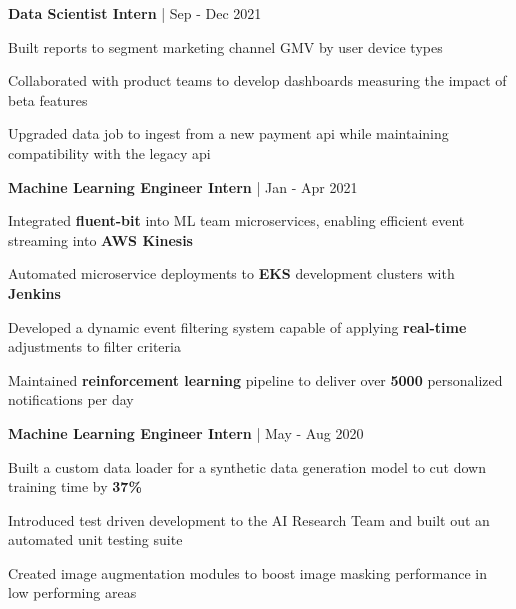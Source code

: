 \begin{cventries}
\cventry
{\textbf{Data Scientist Intern} | \color{awesome}{Shopify}}
{Sep - Dec 2021} %
{ %
\begin{cvitems}
\item {Built reports to segment marketing channel GMV by user device types}
\item {Collaborated with product teams to develop dashboards measuring the impact of beta features}
\item {Upgraded data job to ingest from a new payment api while maintaining compatibility with the legacy api}
\end{cvitems}
}

\cventry
{\textbf{Machine Learning Engineer Intern} | \color{awesome}{Zynga}}
{Jan - Apr 2021} %
{ %
\begin{cvitems}
\item{Integrated \textbf{fluent-bit} into ML team microservices, enabling efficient event streaming into \textbf{AWS Kinesis}}
\item {Automated microservice deployments to \textbf{EKS} development clusters with \textbf{Jenkins}}
\item{Developed a dynamic event filtering system capable of applying \textbf{real-time} adjustments to filter criteria}
\item {Maintained \textbf{reinforcement learning} pipeline to deliver over \textbf{5000} personalized notifications per day}
\end{cvitems}
}


\cventry
{\textbf{Machine Learning Engineer Intern} | \color{awesome}{PerkinElmer}}
{May - Aug 2020} %
{ %
\begin{cvitems}
\item {Built a custom data loader for a synthetic data generation model to cut down training time by \textbf{37\%}}
\item {Introduced test driven development to the AI Research Team and built out an automated unit testing suite}
\item {Created image augmentation modules to boost image masking performance in low performing areas}
\end{cvitems}
}


\end{cventries}
